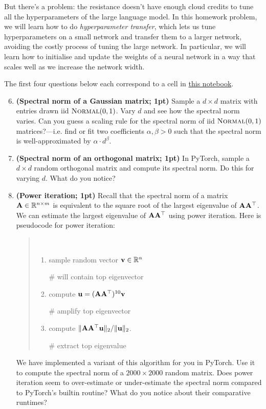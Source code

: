 \documentclass[12pt,letterpaper]{article}
\newcommand{\WCOMMENT}[1]{\hfill\begin{minipage}{16em}\# #1\end{minipage}}
\begin{document}
But there's a problem: the resistance doesn't have enough cloud credits to tune all the hyperparameters of the large language model. In this homework problem, we will learn how to do \textit{hyperparameter transfer}, which lets us tune hyperparameters on a small network and transfer them to a larger network, avoiding the costly process of tuning the large network. In particular, we will learn how to initialise and update the weights of a neural network in a way that scales well as we increase the network width.

The first four questions below each correspond to a cell in \href{https://colab.research.google.com/drive/1urBtP4gaYJwCWOPG_zO7xSGTDgJHE9Y4?usp=sharing}{this notebook}.

\begin{enumerate}
\setcounter{enumi}{5}
    \item \textbf{(Spectral norm of a Gaussian matrix; 1pt)} Sample a $d\times d$ matrix with entries drawn iid $\textsc{Normal}(0,1)$. Vary $d$ and see how the spectral norm varies. Can you guess a scaling rule for the spectral norm of iid $\textsc{Normal}(0,1)$ matrices?---i.e. find or fit two coefficients $\alpha,\beta>0$ such that the spectral norm is well-approximated by $\alpha \cdot d^\beta$.
    
    
    \item \textbf{(Spectral norm of an orthogonal matrix; 1pt)} In PyTorch, sample a $d\times d$ random orthogonal matrix and compute its spectral norm. Do this for varying $d$. What do you notice?

    
    \item \textbf{(Power iteration; 1pt)} Recall that the spectral norm of a matrix ${\mathbf{A}} \in \mathbb{R}^{n\times m}$ is equivalent to the square root of the largest eigenvalue of ${\mathbf{A}} {\mathbf{A}}^\top$. We can estimate the largest eigenvalue of ${\mathbf{A}} {\mathbf{A}}^\top$ using power iteration. Here is pseudocode for power iteration:
    \begin{quote}
    \tt
    \begin{enumerate}[label=(\roman*)]
        \item sample random vector ${\mathbf{v}}\in\mathbb{R}^n$ \hfill \WCOMMENT{will contain top eigenvector}
        \item compute ${\mathbf{u}} = ({\mathbf{A}} {\mathbf{A}}^\top)^{10} {\mathbf{v}}$ \hfill \WCOMMENT{amplify top eigenvector}
        \item compute $\|{\mathbf{A}} {\mathbf{A}}^\top {\mathbf{u}} \|_2 / \|{\mathbf{u}}\|_2$. \hfill \WCOMMENT{extract top eigenvalue}
    \end{enumerate}
    \end{quote}
    We have implemented a variant of this algorithm for you in PyTorch. Use it to compute the spectral norm of a $2000 \times 2000$ random matrix. Does power iteration seem to over-estimate or under-estimate the spectral norm compared to PyTorch's builtin routine? What do you notice about their comparative runtimes?



\end{enumerate}
\end{document}
